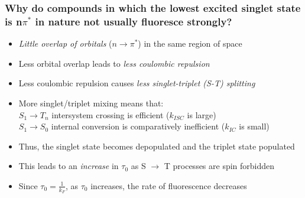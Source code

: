 \documentclass[ignorenonframetext]{beamer}
\begin{document}
\begin{frame}
\frametitle{Why do compounds in which the lowest excited singlet state is n\(\pi^*\) in nature not usually fluoresce strongly?}
\begin{itemize}[<+->]
\item \emph{Little overlap of orbitals} (\(n \rightarrow \pi^*\)) in the same region of space
\item Less orbital overlap leads to \emph{less coulombic repulsion}
\item Less coulombic repulsion causes \emph{less singlet-triplet (S-T) splitting}
\item More singlet/triplet mixing means that:\\
\hspace{10pt} \(S_1 \rightarrow T_n\) intersystem crossing is efficient (\(k_{ISC}\) is large)\\
\hspace{10pt} \(S_1 \rightarrow S_0\) internal conversion is comparatively inefficient (\(k_{IC}\) is small)
\item Thus, the singlet state becomes depopulated and the triplet state populated
\item This leads to an \emph{increase} in \(\tau_0\) as S \(\rightarrow\) T processes are spin forbidden
\item Since \(\tau_0 = \frac{1}{k_F}\), as \(\tau_0\) increases, the rate of fluorescence decreases
\end{itemize}
\end{frame}
\end{document}
